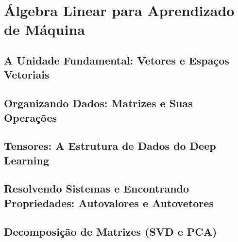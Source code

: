 
\chapter{Álgebra Linear para Aprendizado de Máquina}
\label{cap:algebra-linear-ia}

\section{A Unidade Fundamental: Vetores e Espaços Vetoriais}

\section{Organizando Dados: Matrizes e Suas Operações}

\section{Tensores: A Estrutura de Dados do Deep Learning} 

\section{Resolvendo Sistemas e Encontrando Propriedades: Autovalores e Autovetores}

\section{Decomposição de Matrizes (SVD e PCA)}